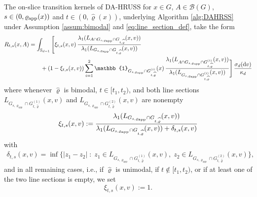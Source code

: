 \documentclass[sn-mathphys-num]{sn-jnl}%
\theoremstyle{thmstyleone}%
\theoremstyle{thmstyletwo}%
\theoremstyle{thmstylethree}%
\newcommand{\rhoapp}{\varrho_{{\rm app}}}
\newcommand{\change}[1]{\bgroup\color{black}#1\egroup}    %
\begin{document}
\begin{appendices}
The on-slice transition kernels of DA-HRUSS for $x\in G$, $A\in\mathcal{B}(G)$, $s \in (0, \rhoapp(x))$ and $t \in (0, \widehat{\varrho}(x))$, \change{underlying Algorithm \ref{alg:DAHRSS} under Assumption \ref{assum:bimodal} and \eqref{eq:line_section_def}}, take the form 
\begin{align*}
    R_{t,s}(x,A)&=\int_{\mathbb{S}_{d-1}} \change{\Biggl[}  \xi_{t,s}(x,v) \, \frac{\lambda_1(L_{A \cap G_{s,\varrho_{\textmd{app}}}\cap G_{t,\widehat{\varrho}}}(x,v))}  {\lambda_1(L_{G_{s,\varrho_{\textmd{app}}}\cap G_{t,\widehat{\varrho}}}(x,v))} \\
    &\qquad+ (1-\xi_{t,s}(x,v)) \sum_{i=1}^2 \mathbb{1}_{G_{s,\varrho_{\textmd{app}}}\cap G^{(i)}_{t,\widehat{\varrho}}}(x) \,  \frac{\lambda_1(L_{A \cap G_{s,\varrho_{\textmd{app}}}\cap G^{(i)}_{t,\widehat{\varrho}}}(x,v))}  {\lambda_1(L_{G_{s,\varrho_{\textmd{app}}}\cap G^{(i)}_{t,\widehat{\varrho}}}(x,v))} \change{\Biggr]}  \, \frac{\sigma_d(\mathrm{d}v)}{\kappa_d} 
\end{align*}
\change{where whenever $\widehat{\varrho}$ is bimodal, $t\in[t_1,t_2)$, and both line sections
$L_{G_{s,\varrho_{\mathrm{app}}}\cap G^{(1)}_{t,\widehat{\varrho}}}(x,v)$ and $L_{G_{s,\varrho_{\mathrm{app}}}\cap G^{(2)}_{t,\widehat{\varrho}}}(x,v)$
are nonempty}
\begin{align*}
     \xi_{t,s}(x,v):=\frac{\lambda_1(L_{G_{s,\varrho_{\textmd{app}}}\cap G_{t,\widehat{\varrho}}}(x,v))}{\lambda_1(L_{G_{s,\varrho_{\textmd{app}}}\cap G_{t,\widehat{\varrho}}}(x,v))+\delta_{t,s}(x,v)} 
\end{align*}
\change{with}
\begin{align*}
      \delta_{t,s}(x,v)
  =\inf\bigl\{|z_1 - z_2|\;:\;
    z_1\in L_{G_{s,\varrho_{\mathrm{app}}}\cap G^{(1)}_{t,\widehat{\varrho}}}(x,v),\;
    z_2\in L_{G_{s,\varrho_{\mathrm{app}}}\cap G^{(2)}_{t,\widehat{\varrho}}}(x,v)
  \bigr\},
\end{align*}
\change{
and in all remaining cases, i.e., if $\widehat{\varrho}$ is unimodal, if $t\notin[t_1,t_2)$, or if at least one of the two line sections is empty, we set}
\[
    \xi_{t,s}(x,v):=1.
\]


\end{appendices}
\end{document}
